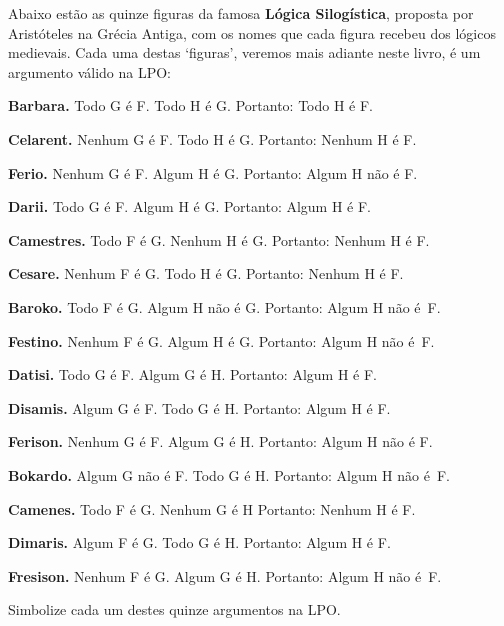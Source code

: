 \practiceproblems
\problempart
\label{pr.BarbaraEtc}
Abaixo estão as quinze figuras da famosa \textbf{Lógica Silogística}, proposta por Aristóteles na Grécia Antiga, com os nomes que cada figura recebeu dos lógicos medievais.
Cada uma destas `figuras', veremos mais adiante neste livro, é um argumento válido na LPO:
\begin{earg}\small 
	\item \textbf{Barbara.} Todo G é F. Todo H é G. Portanto:  Todo H é F.
	\item \textbf{Celarent.} Nenhum G é F. Todo H é G. Portanto: Nenhum H é F.
	\item \textbf{Ferio.} Nenhum G é F. Algum H é G. Portanto: Algum H não é F.
	\item \textbf{Darii.} Todo G é F. Algum H é G. Portanto: Algum H é F.
	\item \textbf{Camestres.} Todo F é G. Nenhum H é G. Portanto: Nenhum H é F.
	\item \textbf{Cesare.} Nenhum F é G. Todo H é G. Portanto: Nenhum H é F.
	\item \textbf{Baroko.} Todo F é G. Algum H não é G. Portanto: Algum H não é~F.
	\item \textbf{Festino.} Nenhum F é G. Algum H é G. Portanto: Algum H não é~F.
	\item \textbf{Datisi.} Todo G é F. Algum G é H. Portanto: Algum H é F.
	\item \textbf{Disamis.} Algum G é F. Todo G é H. Portanto: Algum H é F.
	\item \textbf{Ferison.} Nenhum G é F. Algum G é H. Portanto: Algum H não é F.
	\item \textbf{Bokardo.} Algum G não é F. Todo G é H. Portanto:  Algum H não é~F.
	\item \textbf{Camenes.} Todo F é G. Nenhum G é H Portanto: Nenhum H é F.
	\item \textbf{Dimaris.} Algum F é G. Todo G é H. Portanto: Algum H é F.
	\item \textbf{Fresison.} Nenhum F é G. Algum G é H. Portanto: Algum H não é~F.
\end{earg}
Simbolize cada um destes quinze argumentos na LPO.

\

